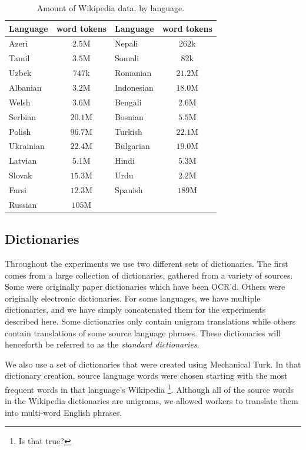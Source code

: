 \documentclass[11pt]{article}
\begin{document}
\begin{table}\footnotesize
\begin{center}
\begin{tabular}{|l|c|l|c|}
\hline
Language & word tokens & Language & word tokens \\
\hline
Azeri & $2.5$M & Nepali & $262$k \\
Tamil & $3.5$M & Somali & $82$k \\
Uzbek & $747$k & Romanian & $21.2$M \\
Albanian & $3.2$M & Indonesian & $18.0$M \\
Welsh & $3.6$M & Bengali & $2.6$M \\
Serbian & $20.1$M & Bosnian & $5.5$M \\
Polish & $96.7$M & Turkish & $22.1$M \\
Ukrainian & $22.4$M & Bulgarian & $19.0$M\\
Latvian & $5.1$M & Hindi & $5.3$M\\
Slovak & $15.3$M & Urdu & $2.2$M\\
Farsi & $12.3$M & Spanish & $189$M\\
Russian & $105$M & &\\
\hline
\end{tabular}
\end{center}
\caption{\label{table:wiki}Amount of Wikipedia data, by language.}
\end{table}

\subsection {Dictionaries}\label{ssec:dicts}

Throughout the experiments we use two different sets of dictionaries. The first comes from a large collection of dictionaries, gathered from a variety of sources. Some were originally paper dictionaries which have been OCR'd. Others were originally electronic dictionaries. For some languages, we have multiple dictionaries, and we have simply concatenated them for the experiments described here. Some dictionaries only contain unigram translations while others contain translations of some source language phrases. These dictionaries will henceforth be referred to as the {\it standard dictionaries}. 

We also use a set of dictionaries that were created using Mechanical Turk. In that dictionary creation, source language words were chosen starting with the most frequent words in that language's Wikipedia \footnote{Is that true?}. Although all of the source words in the Wikipedia dictionaries are unigrams, we allowed workers to translate them into multi-word English phrases. 
\end{document}
